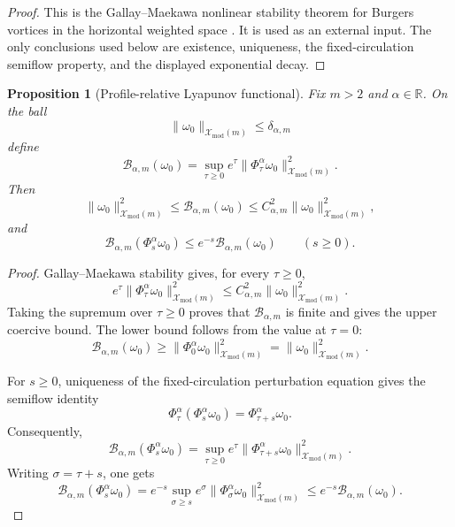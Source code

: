 \documentclass[11pt]{amsart}
\theoremstyle{plain}
\newtheorem{proposition}[theorem]{Proposition}
\theoremstyle{definition}
\theoremstyle{remark}
\numberwithin{equation}{section}
\begin{document}
\begin{proof}
This is the Gallay--Maekawa nonlinear stability theorem for Burgers vortices in
the horizontal weighted space \cite{GallayMaekawa}.  It is used as an external
input.  The only conclusions used below are existence, uniqueness, the
fixed-circulation semiflow property, and the displayed exponential decay.
\end{proof}

\begin{proposition}[Profile-relative Lyapunov functional]\label{prop:bv-lyap}
Fix \(m>2\) and \(\alpha\in\mathbb R\).  On the ball
\[
   \|\omega_0\|_{\mathcal X_{\mathrm{mod}}(m)}
   \le\delta_{\alpha,m}
\]
define
\[
   \mathcal B_{\alpha,m}(\omega_0)
   =
   \sup_{\tau\ge0}e^\tau
   \|\Phi_\tau^\alpha\omega_0\|_{\mathcal X_{\mathrm{mod}}(m)}^2 .
\]
Then
\[
   \|\omega_0\|_{\mathcal X_{\mathrm{mod}}(m)}^2
   \le
   \mathcal B_{\alpha,m}(\omega_0)
   \le
   C_{\alpha,m}^2
   \|\omega_0\|_{\mathcal X_{\mathrm{mod}}(m)}^2,
\]
and
\[
   \mathcal B_{\alpha,m}(\Phi_s^\alpha\omega_0)
   \le
   e^{-s}\mathcal B_{\alpha,m}(\omega_0)
   \qquad(s\ge0).
\]
\end{proposition}

\begin{proof}
Gallay--Maekawa stability gives, for every \(\tau\ge0\),
\[
   e^\tau
   \|\Phi_\tau^\alpha\omega_0\|_{\mathcal X_{\mathrm{mod}}(m)}^2
   \le
   C_{\alpha,m}^2
   \|\omega_0\|_{\mathcal X_{\mathrm{mod}}(m)}^2 .
\]
Taking the supremum over \(\tau\ge0\) proves that
\(\mathcal B_{\alpha,m}\) is finite and gives the upper coercive bound.  The
lower bound follows from the value at \(\tau=0\):
\[
   \mathcal B_{\alpha,m}(\omega_0)
   \ge
   \|\Phi_0^\alpha\omega_0\|_{\mathcal X_{\mathrm{mod}}(m)}^2
   =
   \|\omega_0\|_{\mathcal X_{\mathrm{mod}}(m)}^2 .
\]

For \(s\ge0\), uniqueness of the fixed-circulation perturbation equation gives
the semiflow identity
\[
   \Phi_\tau^\alpha(\Phi_s^\alpha\omega_0)
   =
   \Phi_{\tau+s}^\alpha\omega_0 .
\]
Consequently,
\[
   \mathcal B_{\alpha,m}(\Phi_s^\alpha\omega_0)
   =
   \sup_{\tau\ge0}
      e^\tau
      \|\Phi_{\tau+s}^\alpha\omega_0\|_{\mathcal X_{\mathrm{mod}}(m)}^2 .
\]
Writing \(\sigma=\tau+s\), one gets
\[
   \mathcal B_{\alpha,m}(\Phi_s^\alpha\omega_0)
   =
   e^{-s}\sup_{\sigma\ge s}
      e^\sigma
      \|\Phi_\sigma^\alpha\omega_0\|_{\mathcal X_{\mathrm{mod}}(m)}^2
   \le
   e^{-s}\mathcal B_{\alpha,m}(\omega_0).
\]
\end{proof}
\end{document}
